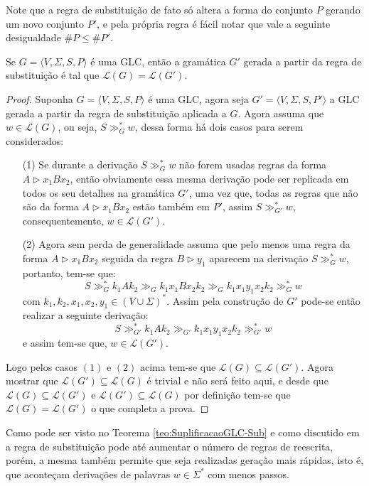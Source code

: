 Note que a regra de substituição de fato só altera a forma do conjunto $P$ gerando um novo conjunto $P'$, e pela própria regra é fácil notar que vale a seguinte desigualdade $\# P \leq \# P'$. 

\begin{theorem}\label{teo:SuplificacaoGLC-Sub}
    Se $G = \langle V, \Sigma, S, P\rangle$ é uma GLC, então a gramática $G'$ gerada a partir da regra de substituição é tal que $\mathcal{L}(G) = \mathcal{L}(G')$.
\end{theorem}

\begin{proof}
    Suponha $G = \langle V, \Sigma, S, P\rangle$ é uma GLC, agora seja $G' = \langle V, \Sigma, S, P'\rangle$ a GLC gerada a partir da regra de substituição aplicada a $G$. Agora assuma que $w \in \mathcal{L}(G)$, ou seja, $S \gg_G^* w$, dessa forma há dois casos para serem considerados:
    \begin{itemize}
        \item[(1)] Se durante a derivação $S \gg_G^* w$ não forem usadas regras da forma $A \rhd x_1Bx_2$, então obviamente essa mesma derivação pode ser replicada em todos os seu detalhes na gramática $G'$, uma vez que, todas as regras que não são da forma $A \rhd x_1Bx_2$ estão também em $P'$, assim $S \gg_{G'}^* w$, consequentemente, $w \in \mathcal{L}(G')$.
        \item[(2)] Agora sem perda de generalidade assuma que pelo menos uma regra da forma  $A \rhd x_1Bx_2$ seguida da regra $B \rhd y_1$ aparecem na derivação $S \gg_G^* w$, portanto, tem-se que:
        $$S \gg_G^* k_1Ak_2 \gg_{G} k_1x_1Bx_2k_2 \gg_{G} k_1x_1y_1x_2k_2 \gg^*_G w $$
        com $k_1, k_2, x_1, x_2, y_1 \in (V \cup \Sigma)^*$. Assim pela construção de $G'$ pode-se então realizar a seguinte derivação:
        $$S \gg^*_{G'} k_1Ak_2 \gg_{G'} k_1x_1y_1x_2k_2  \gg^*_{G'} w$$
        e assim tem-se que, $w \in \mathcal{L}(G')$.
    \end{itemize}
    Logo pelos casos $(1)$ e $(2)$ acima tem-se que $\mathcal{L}(G) \subseteq \mathcal{L}(G')$. Agora mostrar que $\mathcal{L}(G') \subseteq \mathcal{L}(G)$ é trivial e não será feito aqui, e desde que $\mathcal{L}(G) \subseteq \mathcal{L}(G')$ e $\mathcal{L}(G') \subseteq \mathcal{L}(G)$ por definição tem-se que $\mathcal{L}(G) = \mathcal{L}(G')$ o que completa a prova.
\end{proof}

Como pode ser visto no Teorema \ref{teo:SuplificacaoGLC-Sub} e como discutido em \cite{benjaLivro2010} a regra de substituição pode até aumentar o número de regras de reescrita, porém, a mesma também permite que seja realizadas geração mais rápidas, isto é, que aconteçam derivações de palavras $w \in \Sigma^*$ com menos passos.

